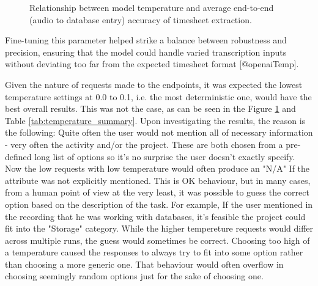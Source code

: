 \documentclass[
  digital,     %
  oneside,     %
  nosansbold,  %
  nocolorbold, %
  lof,         %
  lot,         %
]{fithesis4}
\begin{document}
\begin{figure}[ht]
    \centering
    \caption{Relationship between model temperature and average end-to-end (audio to database entry) accuracy of timesheet extraction.}
    \label{fig:temp_vs_accuracy}
\end{figure}

\shorthandoff{-}
\begin{markdown}

Fine-tuning this parameter helped strike a balance between robustness and precision, ensuring that the model could handle varied transcription inputs without deviating too far from the expected timesheet format [@openaiTemp].

\end{markdown}
\shorthandon{-}

Given the nature of requests made to the endpoints, it was expected the lowest temperature settings at 0.0 to 0.1, i.e. the most deterministic one, would have the best overall results. This was not the case, as can be seen in the Figure \ref{fig:temp_vs_accuracy} and Table \ref{tab:temperature_summary}. Upon investigating the results, the reason is the following: Quite often the user would not mention all of necessary information - very often the activity and/or the project. These are both chosen from a pre-defined long list of options so it's no surprise the user doesn't exactly specify. Now the low requests with low temperature would often produce an "N/A" If the attribute was not explicitly mentioned. This is OK behaviour, but in many cases, from a human point of view at the very least, it was possible to guess the correct option based on the description of the task. For example, If the user mentioned in the recording that he was working with databases, it's feasible the project could fit into the "Storage" category. While the higher tempereture requests would differ across multiple runs, the guess would sometimes be correct. Choosing too high of a temperature caused the responses to always try to fit into some option rather than choosing a more generic one. That behaviour would often overflow in choosing seemingly random options just for the sake of choosing one.
\end{document}
